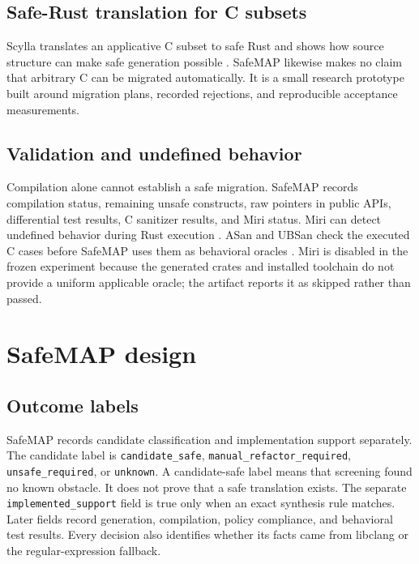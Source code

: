 \documentclass[conference]{IEEEtran}
\newcommand{\tool}{SafeMAP\xspace}
\begin{document}
\subsection{Safe-Rust translation for C subsets}

Scylla translates an applicative C subset to safe Rust and shows how source
structure can make safe generation possible \cite{fromherz2026scylla}. \tool
likewise makes no claim that arbitrary C can be migrated automatically. It is a
small research prototype built around migration plans, recorded rejections, and
reproducible acceptance measurements.

\subsection{Validation and undefined behavior}

Compilation alone cannot establish a safe migration. \tool records compilation
status, remaining unsafe constructs, raw pointers in public APIs, differential
test results, C sanitizer results, and Miri status. Miri can detect undefined
behavior during Rust execution \cite{jung2026miri}. ASan and UBSan check the
executed C cases before \tool uses them as behavioral oracles
\cite{serebryany2012asan,clangubsan}. Miri is disabled in the frozen experiment
because the generated crates and installed toolchain do not provide a uniform
applicable oracle; the artifact reports it as skipped rather than passed.

\section{SafeMAP design}

\subsection{Outcome labels}

\tool records candidate classification and implementation support separately.
The candidate label is \texttt{candidate\_safe},
\texttt{manual\_refactor\_required}, \texttt{unsafe\_required}, or
\texttt{unknown}. A candidate-safe label means that screening found no known
obstacle. It does not prove that a safe translation exists. The separate
\texttt{implemented\_support} field is true only when an exact synthesis rule
matches. Later fields record generation, compilation, policy compliance, and
behavioral test results. Every decision also identifies whether its facts came
from libclang or the regular-expression fallback.
\end{document}
